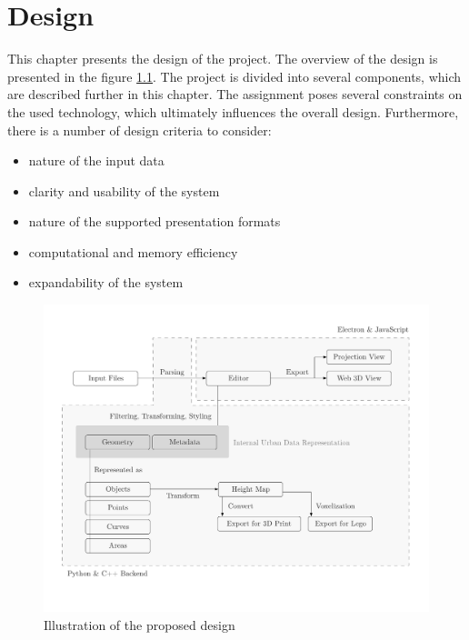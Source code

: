 \chapter{Design}
This chapter presents the design of the project. The overview of the design is presented in the figure \ref{fig:design}. The project is divided into several components, which are described further in this chapter. The assignment poses several constraints on the used technology, which ultimately influences the overall design. Furthermore, there is a number of design criteria to consider:
\begin{itemize}[noitemsep]
    \item nature of the input data
    \item clarity and usability of the system
    \item nature of the supported presentation formats
    \item computational and memory efficiency
    \item expandability of the system
\end{itemize}

\begin{figure}[h]
    \centering
    \includegraphics[width=\linewidth]{figures/app.pdf}
    \caption{Illustration of the proposed design}
    \label{fig:design}
\end{figure}

